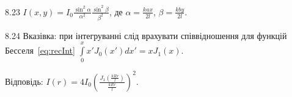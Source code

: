 \begin{Solution}{8.{23}}
	$I(x,y) = I_0\frac{\sin^2\alpha}{\alpha^2}\frac{\sin^2\beta}{\beta^2}$, де $\alpha = \frac{kax}{2l}$, $\beta=\frac{kby}{2l}$.
\end{Solution}
\begin{Solution}{8.{24}}
    Вказівка: при інтегруванні слід врахувати співвідношення для функцій Бесселя~\eqref{eq:recInt} $\int\limits_0^x x'J_0(x')dx' = xJ_1(x)$.

	Відповідь: $I(r) = 4I_0\left( \frac{J_1\left( \frac{kRr}{l}\right) }{\frac{kRr}{l}}\right)^2$.
\end{Solution}
